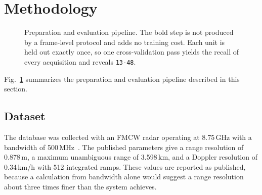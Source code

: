 \documentclass[conference]{IEEEtran}
\begin{document}
\section{Methodology}
\label{sec:method}

\begin{figure}[t]
\centering
{}
\caption{Preparation and evaluation pipeline. The bold step is not produced by a frame-level protocol and adds no training cost. Each unit is held out exactly once, so one cross-validation pass yields the recall of every acquisition and reveals \texttt{13-48}.}
\label{fig:pipeline}
\end{figure}

Fig.~\ref{fig:pipeline} summarizes the preparation and evaluation pipeline described in this section.

\subsection{Dataset}

The database was collected with an FMCW radar operating at 8.75\,GHz with a bandwidth of 500\,MHz~\cite{quevedo2019}. The published parameters give a range resolution of 0.878\,m, a maximum unambiguous range of 3.598\,km, and a Doppler resolution of 0.34\,km/h with 512 integrated ramps. These values are reported as published, because a calculation from bandwidth alone would suggest a range resolution about three times finer than the system achieves.
\end{document}
